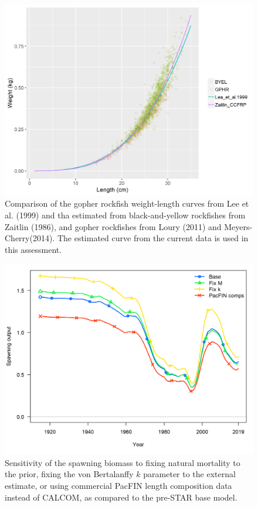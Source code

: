 \documentclass[12pt,]{article}
\begin{document}
\begin{figure}
\centering
\includegraphics{Figures/GBY_weight_length.png}
\caption{Comparison of the gopher rockfish weight-length curves from Lee
et al. (1999) and tha estimated from black-and-yellow rockfishes from
Zaitlin (1986), and gopher rockfishes from Loury (2011) and
Meyers-Cherry(2014). The estimated curve from the current data is used
in this assessment. \label{fig:GBY_weight_length}}
\end{figure}

\FloatBarrier

\begin{figure}
\centering
\includegraphics{Figures/sensitivity1_spawnbio.png}
\caption{Sensitivity of the spawning biomass to fixing natural mortality
to the prior, fixing the von Bertalanffy \(k\) parameter to the external
estimate, or using commercial PacFIN length composition data instead of
CALCOM, as compared to the pre-STAR base model.
\label{fig:sensitivity1_spawnbio}}
\end{figure}
\end{document}
